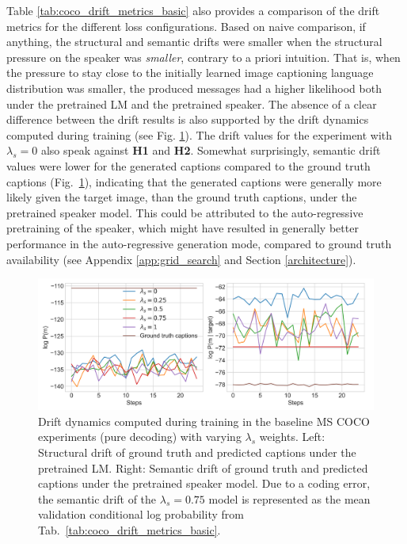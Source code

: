 Table \ref{tab:coco_drift_metrics_basic} also provides a comparison of the drift metrics for the different loss configurations. Based on naive comparison, if anything, the structural and semantic drifts were smaller when the structural pressure on the speaker was \emph{smaller}, contrary to a priori intuition. That is, when the pressure to stay close to the initially learned image captioning language distribution was smaller, the produced messages had a higher likelihood both under the pretrained LM and the pretrained speaker. The absence of a clear difference between the drift results is also supported by the drift dynamics computed during training (see Fig. \ref{fig:coco_baseline_str_sem_drift_all}). 
The drift values for the experiment with $\lambda_s = 0$ also speak against \textbf{H1} and \textbf{H2}. Somewhat surprisingly, semantic drift values were lower for the generated captions compared to the ground truth captions (Fig.~\ref{fig:coco_baseline_str_sem_drift_all}), indicating that the generated captions were generally more likely given the target image, than the ground truth captions, under the pretrained speaker model. This could be attributed to the auto-regressive pretraining of the speaker, which might have resulted in generally better performance in the auto-regressive generation mode, compared to ground truth availability (see Appendix \ref{app:grid_search} and Section \ref{architecture}).
\begin{figure}
	\centering
	\includegraphics[width=\linewidth]{images/coco_structural_semantic_drift_4000_pure_L_S_all_random.png}
	\caption{Drift dynamics computed during training in the baseline MS COCO experiments (pure decoding) with varying $\lambda_s$ weights. Left: Structural drift of ground truth and predicted captions under the pretrained LM. Right: Semantic drift of ground truth and predicted captions under the pretrained speaker model. Due to a coding error, the semantic drift of the $\lambda_s = 0.75$ model is represented as the mean validation conditional log probability from Tab.~\ref{tab:coco_drift_metrics_basic}.}
	\label{fig:coco_baseline_str_sem_drift_all}
\end{figure}

